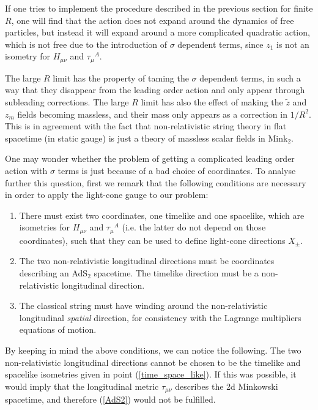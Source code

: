 \documentclass[12pt]{article}
\def\tz{\tilde{z}}
\numberwithin{equation}{section}
\begin{document}
If one tries to implement the procedure described in the previous section for finite $R$, one will find that the action does not expand around the dynamics of free particles, but instead it will expand around a more complicated quadratic action,  which is not free due to the introduction of $\sigma$ dependent terms, 
since $z_1$ is not an isometry for $H_{\mu\nu}$ and $\tau_{\mu}{}^A$.  


The large $R$ limit has the property of taming the $\sigma$ dependent terms, in such a way that they disappear from the leading order action and only appear through subleading corrections.  The large $R$ limit has also the effect of making the $\tz$ and $z_m$ fields becoming massless, and their mass only appears as a correction in $1/R^2$. This is in agreement with the fact that non-relativistic string theory in flat spacetime (in static gauge) is just a theory of massless scalar fields in Mink$_2$. 


One may wonder whether the problem of getting a complicated leading order action with $\sigma$ terms is just because of a bad choice of coordinates. To analyse further this question, first we remark that the following conditions are necessary in order to apply the light-cone gauge to our problem:
\begin{enumerate}
\item There must exist two coordinates, one timelike and one spacelike, which are isometries for $H_{\mu\nu}$ and $\tau_{\mu}{}^A$ (i.e.  the latter do not depend on those coordinates), such that they can be used to define light-cone directions $X_{\pm}$.
\label{time_space_like}
\item The two non-relativistic longitudinal directions must be coordinates describing an AdS$_2$ spacetime.  The timelike direction must be a non-relativistic longitudinal direction.
\label{AdS2}
\item The classical string must have winding around the non-relativistic longitudinal \emph{spatial} direction, for consistency with the Lagrange multipliers equations of motion. 
\label{winding}
\end{enumerate}
By keeping in mind the above conditions, we can notice the following. The two non-relativistic longitudinal directions cannot be chosen to be the timelike and spacelike isometries given in point (\ref{time_space_like}).  If this was possible,  it would imply that the longitudinal metric $\tau_{\mu\nu}$ describes the 2d Minkowski spacetime, and therefore (\ref{AdS2}) would not be fulfilled. 
\end{document}
